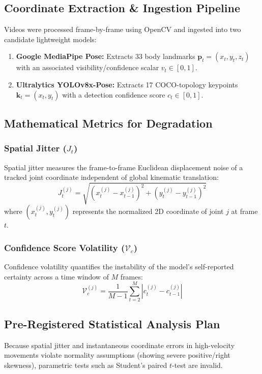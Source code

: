 \subsection{Coordinate Extraction \& Ingestion Pipeline}
Videos were processed frame-by-frame using OpenCV and ingested into two candidate lightweight models:
\begin{enumerate}
    \item \textbf{Google MediaPipe Pose:} Extracts 33 body landmarks $\mathbf{p}_t = (x_t, y_t, z_t)$ with an associated visibility/confidence scalar $v_t \in [0, 1]$.
    \item \textbf{Ultralytics YOLOv8x-Pose:} Extracts 17 COCO-topology keypoints $\mathbf{k}_t = (x_t, y_t)$ with a detection confidence score $c_t \in [0, 1]$.
\end{enumerate}

\subsection{Mathematical Metrics for Degradation}

\subsubsection{Spatial Jitter ($J_t$)}
Spatial jitter measures the frame-to-frame Euclidean displacement noise of a tracked joint coordinate independent of global kinematic translation:
\begin{equation}
    J_t^{(j)} = \sqrt{\left( x_t^{(j)} - x_{t-1}^{(j)} \right)^2 + \left( y_t^{(j)} - y_{t-1}^{(j)} \right)^2}
    \label{eq:jitter}
\end{equation}
where $(x_t^{(j)}, y_t^{(j)})$ represents the normalized 2D coordinate of joint $j$ at frame $t$.

\subsubsection{Confidence Score Volatility ($\mathcal{V}_c$)}
Confidence volatility quantifies the instability of the model's self-reported certainty across a time window of $M$ frames:
\begin{equation}
    \mathcal{V}_c^{(j)} = \frac{1}{M-1} \sum_{t=2}^{M} \left| c_t^{(j)} - c_{t-1}^{(j)} \right|
    \label{eq:confidence_volatility}
\end{equation}

\subsection{Pre-Registered Statistical Analysis Plan}
Because spatial jitter and instantaneous coordinate errors in high-velocity movements violate normality assumptions (showing severe positive/right skewness), parametric tests such as Student's paired $t$-test are invalid. 

